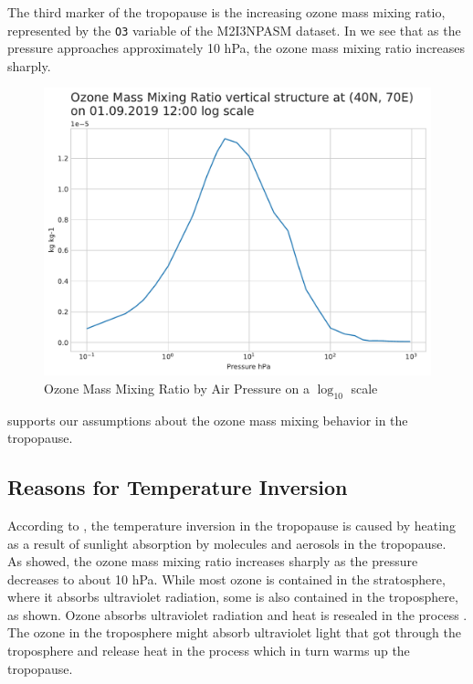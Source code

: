 \documentclass[../00_main.tex]{subfiles}
\begin{document}
The third marker of the tropopause is the increasing ozone mass mixing ratio,
represented by the \texttt{O3} variable of the M2I3NPASM dataset. In
 we see that as the pressure approaches approximately 10 hPa, the
ozone mass mixing ratio increases sharply.
\begin{figure}[H]
\center
    \includegraphics[width=\textwidth]{../graphics/ozone_log}
    \vspace{-20pt}
    \caption{Ozone Mass Mixing Ratio by Air Pressure on a $\log_{10}$ scale}
    \label{ozone}
\end{figure}
 supports our assumptions about the ozone mass mixing behavior in
the tropopause.

\subsection{Reasons for Temperature Inversion}

According to \cite{inversion}, the temperature inversion in the tropopause is caused by
heating as a result of sunlight absorption by molecules and aerosols in the
tropopause.\\
As  showed, the ozone mass mixing ratio increases sharply as the
pressure decreases to about 10 hPa. While most ozone is contained in the
stratosphere, where it absorbs ultraviolet radiation, some is also contained
in the troposphere, as shown. Ozone absorbs ultraviolet radiation and heat is
resealed in the process \cite{ozone}.
The ozone in the troposphere might absorb ultraviolet light that got through
the troposphere and release heat in the process which in turn warms up the
tropopause.
\end{document}

